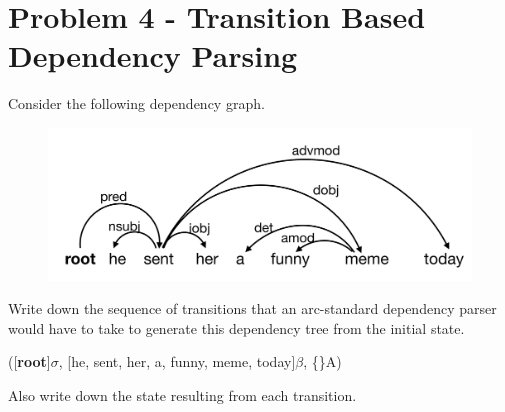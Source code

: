 \documentclass[twoside,11pt]{homework}
\begin{document}
\section*{Problem 4 - Transition Based Dependency Parsing}
\begin{prob}
  Consider the following dependency graph.
    \begin{figure}[h]
      \centering
      \includegraphics[width=0.7\linewidth]{../materials/he_sent_her_a_funny_meme_today}
      \label{fig:02}
    \end{figure}
  Write down the sequence of transitions that an arc-standard dependency parser
  would have to take to generate this dependency tree from the initial state.

  ([\textbf{root}]$\sigma$, [he, sent, her, a, funny, meme, today]$\beta$, \{\}A)

  Also write down the state resulting from each transition.
\end{prob}
\end{document}
